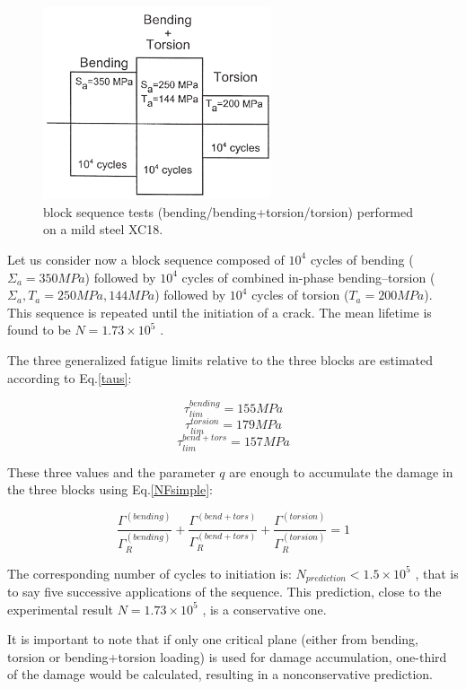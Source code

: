 \begin{figure}[h!]
	\centering
	\includegraphics[width=0.6\textwidth]{figures//block.png} 
	\caption{block sequence tests (bending/bending+torsion/torsion) performed on a mild
		steel XC18.}
	\label{block}
\end{figure} 

Let us consider now a block sequence composed of
$10^4$ cycles of bending ($\Sigma_a =350 MPa$) followed by $10^4$
cycles of combined in-phase bending–torsion ($\Sigma_a ,T_a =250 MPa, 144 MPa$)
followed by $10^4$ cycles of torsion ($T_a =200 MPa$). This
sequence is repeated until the initiation of a crack. The
mean lifetime is found to be $N=1.73\times10^5$ .

The three generalized fatigue
limits relative to the three blocks are estimated according
to Eq.\eqref{taus}:

$$\tau_{lim}^{bending}=155 MPa$$   $$\tau_{lim}^{torsion}=179 MPa$$  $$\tau_{lim}^{bend+tors}=157 MPa$$


These three values and the parameter $q$ are enough to
accumulate the damage in the three blocks using Eq.\eqref{NFsimple}:


$$\frac{\Gamma^{(bending)}}{\Gamma_R^{(bending)}}+\frac{\Gamma^{(bend+tors)}}{\Gamma_R^{(bend+tors)}}+\frac{\Gamma^{(torsion)}}{\Gamma_R^{(torsion)}}=1$$

The corresponding number of cycles to initiation is:
$N_{prediction} <1.5\times10^5$ , that is to say five successive applications of the sequence. This prediction, close to the experimental result $N=1.73\times10^5$ , is a conservative one.

It is important to note that if only one critical plane
(either from bending, torsion or bending+torsion
loading) is used for damage accumulation, one-third of
the damage would be calculated, resulting in a nonconservative prediction.

